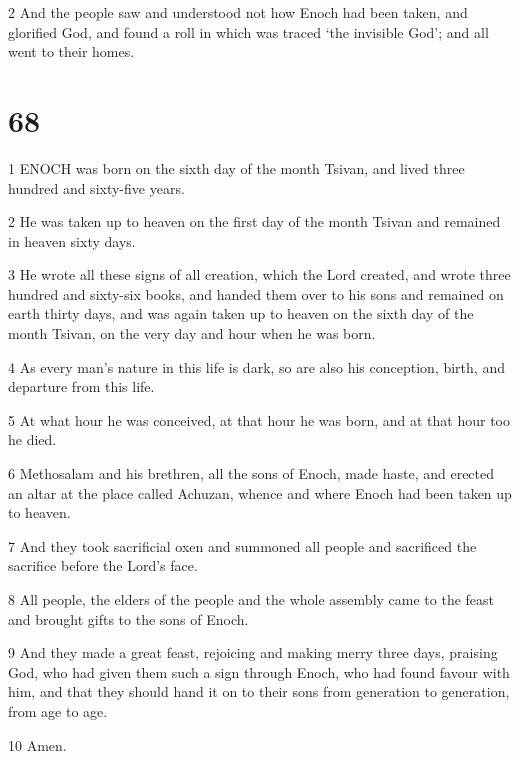 \par 2 And the people saw and understood not how Enoch had been taken, and glorified God, and found a roll in which was traced ‘the invisible God’; and all went to their homes.

\chapter{68}

\par 1 ENOCH was born on the sixth day of the month Tsivan, and lived three hundred and sixty-five years.

\par 2 He was taken up to heaven on the first day of the month Tsivan and remained in heaven sixty days.

\par 3 He wrote all these signs of all creation, which the Lord created, and wrote three hundred and sixty-six books, and handed them over to his sons and remained on earth thirty days, and was again taken up to heaven on the sixth day of the month Tsivan, on the very day and hour when he was born.

\par 4 As every man's nature in this life is dark, so are also his conception, birth, and departure from this life.

\par 5 At what hour he was conceived, at that hour he was born, and at that hour too he died.

\par 6 Methosalam and his brethren, all the sons of Enoch, made haste, and erected an altar at the place called Achuzan, whence and where Enoch had been taken up to heaven.

\par 7 And they took sacrificial oxen and summoned all people and sacrificed the sacrifice before the Lord's face.

\par 8 All people, the elders of the people and the whole assembly came to the feast and brought gifts to the sons of Enoch.

\par 9 And they made a great feast, rejoicing and making merry three days, praising God, who had given them such a sign through Enoch, who had found favour with him, and that they should hand it on to their sons from generation to generation, from age to age.

\par 10 Amen.



